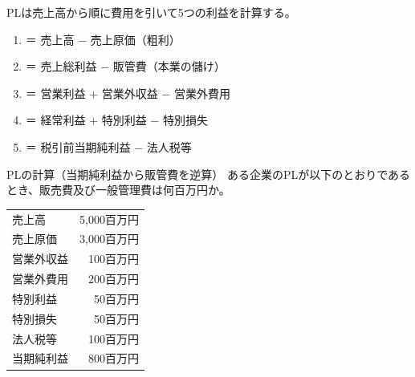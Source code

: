 \begin{teigi}
PLは売上高から順に費用を引いて5つの利益を計算する。

\begin{enumerate}
  \item {}＝ 売上高 $-$ 売上原価（粗利）
  \item {}＝ 売上総利益 $-$ 販管費（本業の儲け）
  \item {}＝ 営業利益 $+$ 営業外収益 $-$ 営業外費用
  \item {}＝ 経常利益 $+$ 特別利益 $-$ 特別損失
  \item {}＝ 税引前当期純利益 $-$ 法人税等
\end{enumerate}
\end{teigi}

\begin{hikaku}
\end{hikaku}

\begin{reidai}{PLの計算（当期純利益から販管費を逆算）}
ある企業のPLが以下のとおりであるとき、販売費及び一般管理費は何百万円か。

\begin{center}
\small
\begin{tabular}{lr}
\toprule
売上高 & 5,000百万円 \\
売上原価 & 3,000百万円 \\
営業外収益 & 100百万円 \\
営業外費用 & 200百万円 \\
特別利益 & 50百万円 \\
特別損失 & 50百万円 \\
法人税等 & 100百万円 \\
当期純利益 & 800百万円 \\
\bottomrule
\end{tabular}
\end{center}

\end{reidai}

